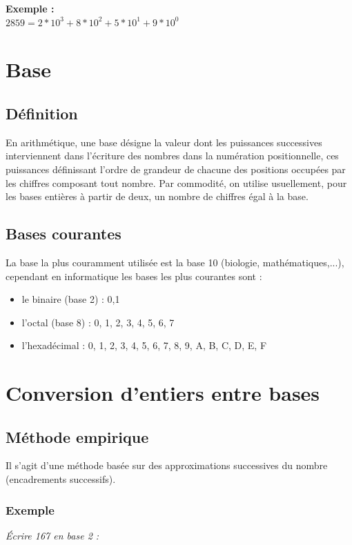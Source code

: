 \documentclass[a4paper,10pt]{book}
\begin{document}
\textbf{Exemple :}\\
$2859=2*10^{3}+8*10^{2}+5*10^{1}+9*10^{0}$

\section{Base}
\subsection{Définition}
En arithmétique, une base désigne la valeur dont les puissances successives interviennent dans l'écriture des nombres dans la numération positionnelle, ces puissances définissant l'ordre de grandeur de chacune des positions occupées par les chiffres composant tout nombre. Par commodité, on utilise usuellement, pour les bases entières à partir de deux, un nombre de chiffres égal à la base.

\subsection{Bases courantes}
La base la plus couramment utilisée est la base 10 (biologie, mathématiques,...), cependant en informatique les bases les plus courantes sont : \begin{itemize}
\item le binaire (base 2) : 0,1
\item l'octal (base 8) : 0, 1, 2, 3, 4, 5, 6, 7
\item l'hexadécimal : 0, 1, 2, 3, 4, 5, 6, 7, 8, 9, A, B, C, D, E, F\\ \end{itemize}

\section{Conversion d'entiers entre bases}
\subsection{Méthode empirique}
Il s'agit d'une méthode basée sur des approximations successives du nombre (encadrements successifs).

\subsubsection{Exemple}
\begin{center}
\emph{Écrire 167 en base 2 :}\\ \end{center}
\end{document}

